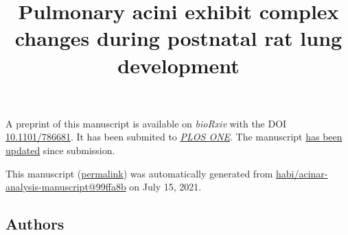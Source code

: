 \documentclass[
  american,
]{article}
\title{Pulmonary acini exhibit complex changes during postnatal rat lung development}
\author{}
\date{}
\begin{document}
\maketitle

A preprint of this manuscript is available on \emph{bioRxiv} with the DOI \href{https://doi.org/10.1101/786681}{10.1101/786681}.
It has been submited to \href{https://journals.plos.org/plosone/}{\emph{PLOS ONE}}.
The manuscript \href{https://github.com/habi/acinar-analysis-manuscript/compare/5e778036e316c47b8bac4ce50086b191a7e3707a...99ffa8bd678eeecd9115c32def3159b50a367a33}{has been updated} since submission.

This manuscript
(\href{https://habi.github.io/acinar-analysis-manuscript/v/99ffa8bd678eeecd9115c32def3159b50a367a33/}{permalink})
was automatically generated
from \href{https://github.com/habi/acinar-analysis-manuscript/tree/99ffa8bd678eeecd9115c32def3159b50a367a33}{habi/acinar-analysis-manuscript@99ffa8b}
on July 15, 2021.

\hypertarget{authors}{%
\subsection{Authors}\label{authors}}
\end{document}
